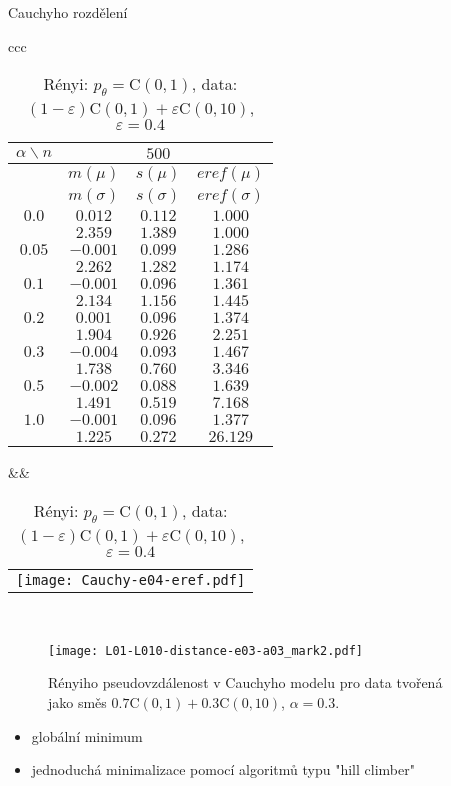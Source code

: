 \documentclass[11pt,a4paper]{beamer}
\begin{document}
\begin{frame}{Cauchyho rozdělení}
\begin{table}[htb] \tiny
\begin{center}
\begin{tabular}{ccc}
	\begin{tabular}{|c|ccc|}
	\hline
	$\alpha\backslash n$ && $500$ & \\
	\hline
	& $m(\mu)$ & $s(\mu)$ & $eref(\mu)$ \\
	& $m(\sigma)$ & $s(\sigma)$ & $eref(\sigma)$ \\
	\hline
	$0.0$ & $ 0.012 $ & $ 0.112 $ & $ 1.000 $\\
	 & $ 2.359 $ & $ 1.389 $ & $ 1.000 $\\
	\hline
	$0.05$ & $ -0.001 $ & $ 0.099 $ & $ 1.286 $\\
	 & $ 2.262 $ & $ 1.282 $ & $ 1.174 $\\
	\hline
	$0.1$ & $ -0.001 $ & $ 0.096 $ & $ 1.361 $\\
	 & $ 2.134 $ & $ 1.156 $ & $ 1.445 $\\
	\hline
	$0.2$ & $ 0.001 $ & $ 0.096 $ & $ 1.374 $\\
	 & $ 1.904 $ & $ 0.926 $ & $ 2.251 $\\
	\hline
	$0.3$ & $ -0.004 $ & $ 0.093 $ & $ 1.467 $\\
	 & $ 1.738 $ & $ 0.760 $ & $ 3.346 $\\
	\hline
	$0.5$ & $ -0.002 $ & $ 0.088 $ & $ 1.639 $\\
	 & $ 1.491 $ & $ 0.519 $ & $ 7.168 $\\
	\hline
	$1.0$ & $ -0.001 $ & $ 0.096 $ & $ 1.377 $\\
	 & $ 1.225 $ & $ 0.272 $ & $ 26.129 $\\
	\hline
	\end{tabular}
&&
	\begin{tabular}{c}
		\texttt{[image: Cauchy-e04-eref.pdf]}			
	\end{tabular}
\\
\end{tabular}
\end{center}
\caption{\footnotesize R\'{e}nyi: $p_\theta = \mathrm{C}(0,1)$, data: $(1-\varepsilon)\mathrm{C}(0,1) + \varepsilon \mathrm{C}(0,10)$, $\varepsilon =  0.4$}
\end{table}
\end{frame}


\begin{frame}
	\begin{figure}
		\texttt{[image: L01-L010-distance-e03-a03\_mark2.pdf]}
		\caption{Rényiho pseudovzdálenost v Cauchyho modelu pro data tvořená jako směs $0.7\mathrm{C}(0,1) + 0.3\mathrm{C}(0,10)$, $\alpha = 0.3.$}
	\end{figure}
	\begin{itemize}
		\item globální minimum
		\item jednoduchá minimalizace pomocí algoritmů typu "hill climber"
	\end{itemize}
\end{frame}
\end{document}
